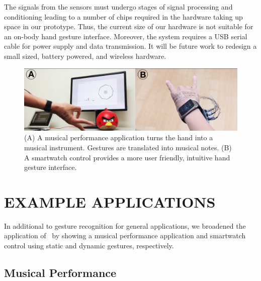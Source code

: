 \documentclass{sigchi}
\begin{document}
The signals from the sensors must undergo stages of signal processing and conditioning leading to a number of chips required in the hardware taking up space in our prototype. Thus, the current size of our hardware is not suitable for an on-body hand gesture interface. Moreover, the system requires a USB serial cable for power supply and data transmission. It will be future work to redesign a small sized, battery powered, and wireless hardware.

\begin{figure}[h]
  \begin{center}
  \includegraphics[width=1\columnwidth]{figures/appsV2.jpg}
  \caption{(A) A musical performance application turns the hand into a musical instrument. Gestures are translated into musical notes. (B) A smartwatch control provides a more user friendly, intuitive hand gesture interface.}
  \label{fig:APPS}
  \end{center}
\end{figure}

\section{EXAMPLE APPLICATIONS}

In additional to gesture recognition for general applications, we broadened the application of \getTitleName\ by showing a musical performance application and smartwatch control using static and dynamic gestures, respectively.
\vspace{10mm}
\subsection{Musical Performance}
\end{document}
